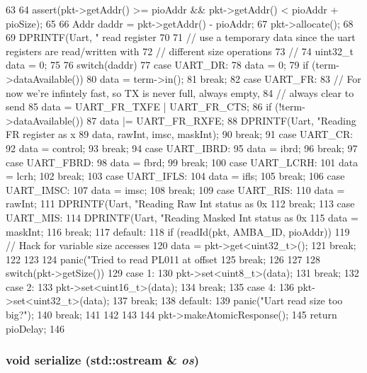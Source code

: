 \begin{DoxyCode}
63 {
64     assert(pkt->getAddr() >= pioAddr && pkt->getAddr() < pioAddr + pioSize);
65 
66     Addr daddr = pkt->getAddr() - pioAddr;
67     pkt->allocate();
68 
69     DPRINTF(Uart, " read register %
70 
71     // use a temporary data since the uart registers are read/written with
72     // different size operations
73     //
74     uint32_t data = 0;
75 
76     switch(daddr) {
77       case UART_DR:
78         data = 0;
79         if (term->dataAvailable())
80             data = term->in();
81         break;
82       case UART_FR:
83         // For now we're infintely fast, so TX is never full, always empty,
84         // always clear to send
85         data = UART_FR_TXFE | UART_FR_CTS;
86         if (!term->dataAvailable())
87             data |= UART_FR_RXFE;
88         DPRINTF(Uart, "Reading FR register as %
      x%
89                 data, rawInt, imsc, maskInt);
90         break;
91       case UART_CR:
92         data = control;
93         break;
94       case UART_IBRD:
95         data = ibrd;
96         break;
97       case UART_FBRD:
98         data = fbrd;
99         break;
100       case UART_LCRH:
101         data = lcrh;
102         break;
103       case UART_IFLS:
104         data = ifls;
105         break;
106       case UART_IMSC:
107         data = imsc;
108         break;
109       case UART_RIS:
110         data = rawInt;
111         DPRINTF(Uart, "Reading Raw Int status as 0x%
112         break;
113       case UART_MIS:
114         DPRINTF(Uart, "Reading Masked Int status as 0x%
115         data = maskInt;
116         break;
117       default:
118         if (readId(pkt, AMBA_ID, pioAddr)) {
119             // Hack for variable size accesses
120             data = pkt->get<uint32_t>();
121             break;
122         }
123 
124         panic("Tried to read PL011 at offset %
125         break;
126     }
127 
128     switch(pkt->getSize()) {
129       case 1:
130         pkt->set<uint8_t>(data);
131         break;
132       case 2:
133         pkt->set<uint16_t>(data);
134         break;
135       case 4:
136         pkt->set<uint32_t>(data);
137         break;
138       default:
139         panic("Uart read size too big?\n");
140         break;
141     }
142 
143 
144     pkt->makeAtomicResponse();
145     return pioDelay;
146 }
\end{DoxyCode}
\hypertarget{classPl011_a53e036786d17361be4c7320d39c99b84}{
\subsubsection[{serialize}]{\setlength{\rightskip}{0pt plus 5cm}void serialize (std::ostream \& {\em os})}}
\label{classPl011_a53e036786d17361be4c7320d39c99b84}


